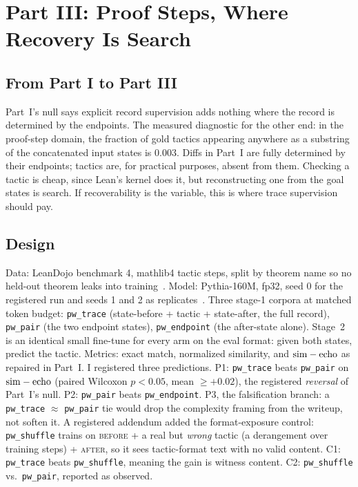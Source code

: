 \section{Part III: Proof Steps, Where Recovery Is Search}\label{sec:part3}

\subsection{From Part I to Part III}

Part~I's null says explicit record supervision adds nothing where the record is determined by the endpoints. The measured diagnostic for the other end: in the proof-step domain, the fraction of gold tactics appearing anywhere as a substring of the concatenated input states is $0.003$. Diffs in Part~I are fully determined by their endpoints; tactics are, for practical purposes, absent from them. Checking a tactic is cheap, since Lean's kernel does it, but reconstructing one from the goal states is search. If recoverability is the variable, this is where trace supervision should pay.

\subsection{Design}

Data: LeanDojo benchmark 4, mathlib4 tactic steps, split by theorem name so no held-out theorem leaks into training~\cite{yang2023leandojo}. Model: Pythia-160M, fp32, seed 0 for the registered run and seeds 1 and 2 as replicates~\cite{biderman2023pythia}. Three stage-1 corpora at matched token budget: \texttt{pw\_trace} (state-before + tactic + state-after, the full record), \texttt{pw\_pair} (the two endpoint states), \texttt{pw\_endpoint} (the after-state alone). Stage~2 is an identical small fine-tune for every arm on the eval format: given both states, predict the tactic. Metrics: exact match, normalized similarity, and $\mathrm{sim}-\mathrm{echo}$ as repaired in Part~I. I registered three predictions. P1: \texttt{pw\_trace} beats \texttt{pw\_pair} on $\mathrm{sim}-\mathrm{echo}$ (paired Wilcoxon $p<0.05$, mean $\geq +0.02$), the registered \emph{reversal} of Part~I's null. P2: \texttt{pw\_pair} beats \texttt{pw\_endpoint}. P3, the falsification branch: a \texttt{pw\_trace} $\approx$ \texttt{pw\_pair} tie would drop the complexity framing from the writeup, not soften it. A registered addendum added the format-exposure control: \texttt{pw\_shuffle} trains on \textsc{before} + a real but \emph{wrong} tactic (a derangement over training steps) + \textsc{after}, so it sees tactic-format text with no valid content. C1: \texttt{pw\_trace} beats \texttt{pw\_shuffle}, meaning the gain is witness content. C2: \texttt{pw\_shuffle} vs.\ \texttt{pw\_pair}, reported as observed.

